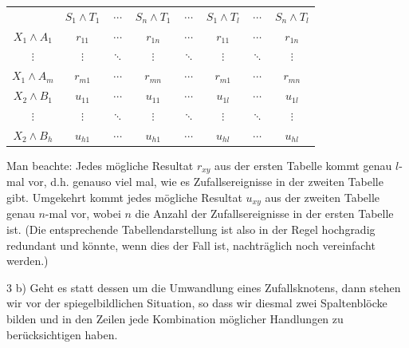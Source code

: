 \begin{small}
\begin{center}
\begin{tabular}{c|ccc|c|ccc|}
                 & $S_1 \wedge T_1$  & $\cdots$ & $S_n \wedge T_1$ & $\cdots$
                 & $S_1 \wedge T_l$  & $\cdots$ & $S_n \wedge T_l$  
                 \\ \cline{1-8} 
$X_1 \wedge A_1$ & $r_{11}$          & $\cdots$ & $r_{1n}$ & $\cdots$ 
                 & $r_{11}$          & $\cdots$ & $r_{1n}$  \\
  $\vdots$       & $\vdots$          & $\ddots$ & $\vdots$ & $\ddots$
                 & $\vdots$          & $\ddots$ & $\vdots$\\
$X_1 \wedge A_m$ & $r_{m1}$          & $\cdots$ & $r_{mn}$ & $\cdots$
                 & $r_{m1}$          & $\cdots$ & $r_{mn}$\\ \cline{1-8}
                   
$X_2 \wedge B_1$ & $u_{11}$          & $\cdots$ & $u_{11}$ & $\cdots$
                 & $u_{1l}$          & $\cdots$ & $u_{1l}$\\
  $\vdots$       & $\vdots$          & $\ddots$ & $\vdots$ & $\ddots$
                 & $\vdots$          & $\ddots$ & $\vdots$\\                  
$X_2 \wedge B_h$ & $u_{h1}$          & $\cdots$ & $u_{h1}$ & $\cdots$
                 & $u_{hl}$          & $\cdots$ & $u_{hl}$\\\cline{1-8}
\end{tabular}
\end{center}
\end{small}

Man beachte: Jedes mögliche Resultat $r_{xy}$ aus der ersten Tabelle kommt genau
$l$-mal vor, d.h. genauso viel mal, wie es Zufallsereignisse in der zweiten
Tabelle gibt. Umgekehrt kommt jedes mögliche Resultat $u_{xy}$ aus der zweiten Tabelle
genau $n$-mal vor, wobei $n$ die Anzahl der Zufallsereignisse in der
ersten Tabelle ist. (Die entsprechende Tabellendarstellung ist also in
der Regel hochgradig redundant und könnte, wenn dies der Fall ist, nachträglich
noch vereinfacht werden.)

\vspace{0.5cm}

3 b) Geht es statt dessen um die Umwandlung eines Zufallsknotens, dann stehen
wir vor der spiegelbildlichen Situation, so dass wir diesmal zwei Spaltenblöcke
bilden und in den Zeilen jede Kombination möglicher Handlungen zu
berücksichtigen haben. 


